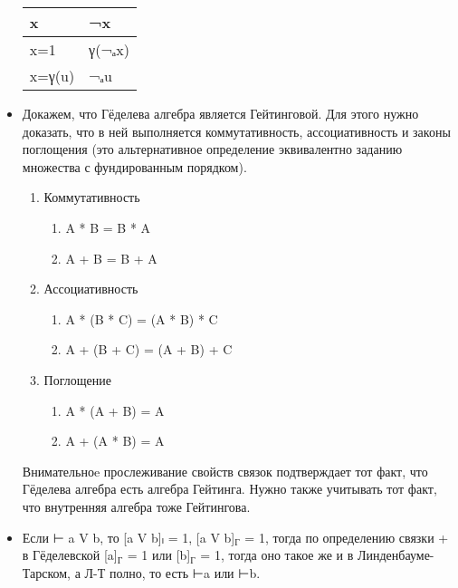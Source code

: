 \documentclass[11pt]{article}
\begin{document}
\begin{itemize}
\begin{center}
\begin{tabular}{ll}
\hline
x & ¬x\\
\hline
x=1 & γ(¬ₐx)\\
x=γ(u) & ¬ₐu\\
\hline
\end{tabular}
\end{center}

\item Докажем, что Гёделева алгебра является Гейтинговой.
Для этого нужно доказать, что в ней выполняется коммутативность,
ассоциативность и законы поглощения (это альтернативное определение
эквивалентно заданию множества с фундированным порядком).
\begin{enumerate}
\item Коммутативность
\begin{enumerate}
\item A * B = B * A
\item A + B = B + A
\end{enumerate}
\item Ассоциативность
\begin{enumerate}
\item A * (B * C) = (A * B) * C
\item A + (B + C) = (A + B) + C
\end{enumerate}
\item Поглощение
\begin{enumerate}
\item A * (A + B) = A
\item A + (A * B) = A
\end{enumerate}
\end{enumerate}
Внимательноe прослеживание свойств связок подтверждает тот факт,
что Гёделева алгебра есть алгебра Гейтинга.
Нужно также учитывать тот факт, что внутренняя алгебра тоже Гейтингова.
\item Если ⊢ a V b, то [a V b]ₗ = 1, [a V b]$_{\text{Г}}$ = 1, тогда по определению
связки + в Гёделевской [a]$_{\text{Г}}$ = 1 или [b]$_{\text{Г}}$ = 1, тогда оно такое же
и в Линденбауме-Тарском, а Л-Т полно, то есть ⊢a или ⊢b.
\end{itemize}
\end{document}
